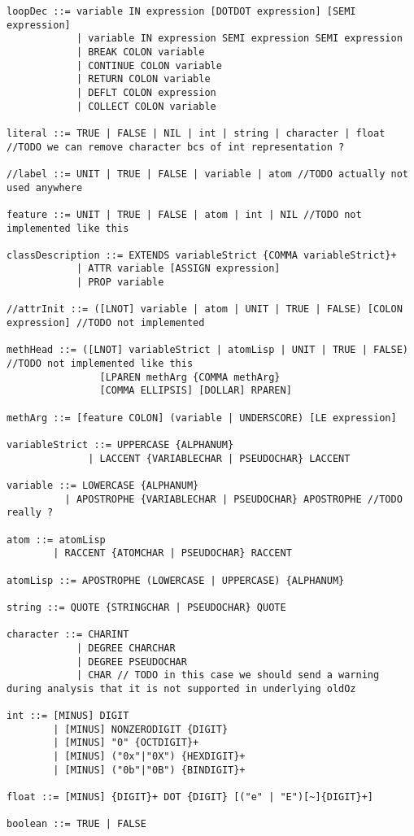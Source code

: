 \begin{lstlisting}[label={lst:newOzEBNF},language=ebnf]
loopDec ::= variable IN expression [DOTDOT expression] [SEMI expression]
            | variable IN expression SEMI expression SEMI expression
            | BREAK COLON variable
            | CONTINUE COLON variable
            | RETURN COLON variable
            | DEFLT COLON expression
            | COLLECT COLON variable

literal ::= TRUE | FALSE | NIL | int | string | character | float //TODO we can remove character bcs of int representation ?

//label ::= UNIT | TRUE | FALSE | variable | atom //TODO actually not used anywhere

feature ::= UNIT | TRUE | FALSE | atom | int | NIL //TODO not implemented like this

classDescription ::= EXTENDS variableStrict {COMMA variableStrict}+
            | ATTR variable [ASSIGN expression]
            | PROP variable

//attrInit ::= ([LNOT] variable | atom | UNIT | TRUE | FALSE) [COLON expression] //TODO not implemented

methHead ::= ([LNOT] variableStrict | atomLisp | UNIT | TRUE | FALSE) //TODO not implemented like this
                [LPAREN methArg {COMMA methArg}
                [COMMA ELLIPSIS] [DOLLAR] RPAREN]

methArg ::= [feature COLON] (variable | UNDERSCORE) [LE expression]

variableStrict ::= UPPERCASE {ALPHANUM}
              | LACCENT {VARIABLECHAR | PSEUDOCHAR} LACCENT

variable ::= LOWERCASE {ALPHANUM}
          | APOSTROPHE {VARIABLECHAR | PSEUDOCHAR} APOSTROPHE //TODO really ?

atom ::= atomLisp
        | RACCENT {ATOMCHAR | PSEUDOCHAR} RACCENT

atomLisp ::= APOSTROPHE (LOWERCASE | UPPERCASE) {ALPHANUM}

string ::= QUOTE {STRINGCHAR | PSEUDOCHAR} QUOTE

character ::= CHARINT
            | DEGREE CHARCHAR
            | DEGREE PSEUDOCHAR
            | CHAR // TODO in this case we should send a warning during analysis that it is not supported in underlying oldOz

int ::= [MINUS] DIGIT
        | [MINUS] NONZERODIGIT {DIGIT}
        | [MINUS] "0" {OCTDIGIT}+
        | [MINUS] ("0x"|"0X") {HEXDIGIT}+
        | [MINUS] ("0b"|"0B") {BINDIGIT}+

float ::= [MINUS] {DIGIT}+ DOT {DIGIT} [("e" | "E")[~]{DIGIT}+]

boolean ::= TRUE | FALSE

\end{lstlisting}
